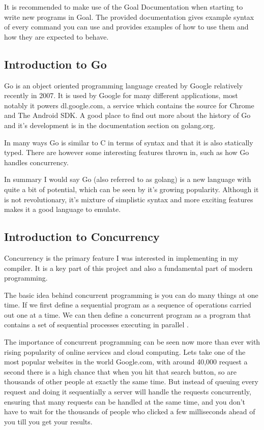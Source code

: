 It is recommended to make use of the Goal Documentation when starting to write new programs in Goal. The provided documentation gives example syntax of every command you can use and provides examples of how to use them and how they are expected to behave.

\subsection{Introduction to Go}

Go is an object oriented programming language created by Google relatively recently in 2007. It is used by Google for many different applications, most notably it powers dl.google.com, a service which contains the source for Chrome and The Android SDK. A good place to find out more about the history of Go and it's development is in the documentation section on golang.org.

In many ways Go is similar to C in terms of syntax and that it is also statically typed. There are however some interesting features thrown in, such as how Go handles concurrency.

In summary I would say Go (also referred to as golang) is a new language with quite a bit of potential, which can be seen by it's growing popularity. Although it is not revolutionary, it's mixture of simplistic syntax and more exciting features makes it a good language to emulate.


\subsection{Introduction to Concurrency}

Concurrency is the primary feature I was interested in implementing in my compiler. It is a key part of this project and also a fundamental part of modern programming. 

The basic idea behind concurrent programming is you can do many things at one time. If we first define a sequential program as a sequence of operations carried out one at a time. We can then define a concurrent program as a program that contains a set of sequential processes executing in parallel \cite[p.~414]{CompGen1997}.

The importance of concurrent programming can be seen now more than ever with rising popularity of online services and cloud computing. Lets take one of the most popular websites in the world Google.com, with around 40,000 request a second there is a high chance that when you hit that search button, so are thousands of other people at exactly the same time. But instead of queuing every request and doing it sequentially a server will handle the requests concurrently, ensuring that many requests can be handled at the same time, and you don't have to wait for the thousands of people who clicked a few milliseconds ahead of you till you get your results.

